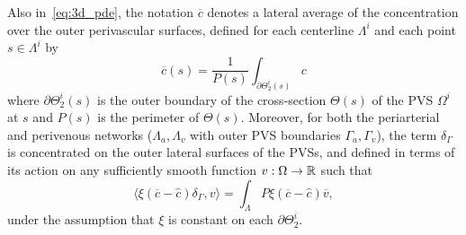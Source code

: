 \documentclass[fleqn,10pt]{wlscirep}
\begin{document}
Also in~\eqref{eq:3d_pde}, the notation $\overline{c}$ denotes a lateral average of the concentration over the outer perivascular surfaces, defined for each centerline $\Lambda^i$ and each point $s \in \Lambda^i$ by
\begin{equation*}
  \overline{c}(s) = \frac{1}{P(s)} \int_{\partial \Theta_2^i(s)} c 
\end{equation*}
where $\partial \Theta_2^i(s)$ is the outer boundary of the cross-section $\Theta(s)$ of the PVS $\Omega^i$ at $s$ and $P(s)$ is the perimeter of $\Theta(s)$. Moreover, for both the periarterial and perivenous networks ($\Lambda_a, \Lambda_v$ with outer PVS boundaries $\Gamma_a, \Gamma_v$), the term $\delta_\Gamma$ is concentrated on the outer lateral surfaces of the PVSs, and defined in terms of its action on any sufficiently smooth function $v : \Omega \rightarrow \mathbb{R}$
such that
\begin{equation*}
  \langle \xi (\overline{c} - \hat c ) \delta_\Gamma, v \rangle =
  \int_{\Lambda} P \xi (\overline{c} - \hat c ) \overline{v}, 
\end{equation*}
under the assumption that $\xi$ is constant on each $\partial
\Theta_2^i$.
\end{document}

